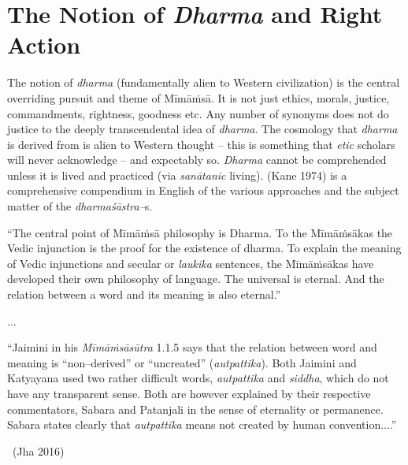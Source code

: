 \section*{The Notion of \textit{Dharma} and Right Action}

The notion of \textit{dharma} (fundamentally alien to Western civilization) is the central overriding pursuit and theme of Mīmāṁsā. It is not just ethics, morals, justice, commandments, rightness, goodness etc. Any number of synonyms does not do justice to the deeply transcendental idea of \textit{dharma}. The cosmology that \textit{dharma} is derived from is alien to Western thought – this is something that \textit{etic} scholars will never acknowledge – and expectably so. \textit{Dharma} cannot be comprehended unless it is lived and practiced (via \textit{sanātanic} living). (Kane 1974) is a comprehensive compendium in English of the various approaches and the subject matter of the \textit{dharmaśāstra–}s.

\begin{myquote}
“The central point of Mīmāṁsā philosophy is Dharma. To the Mīmāṁsākas the Vedic injunction is the proof for the existence of dharma. To explain the meaning of Vedic injunctions and secular or \textit{laukika} sentences, the Mīmāṁsākas have developed their own philosophy of language. The universal is eternal. And the relation between a word and its meaning is also eternal.”
\end{myquote}

\begin{myquote}
...
\end{myquote}

\begin{myquote}
“Jaimini in his \textit{Mīmāṁsāsūtra} 1.1.5 says that the relation between word and meaning is “non–derived” or “uncreated” (\textit{autpattika}). Both Jaimini and Katyayana used two rather difficult words, \textit{autpattika} and \textit{siddha}, which do not have any transparent sense. Both are however explained by their respective commentators, Sabara and Patanjali in the sense of eternality or permanence. Sabara states clearly that \textit{autpattika} means not created by human convention....”

~\hfill (Jha 2016)
\end{myquote}

